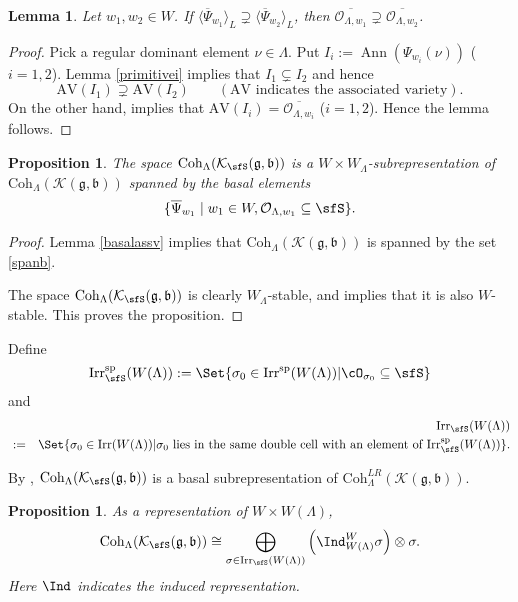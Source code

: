 \documentclass[12pt,a4paper]{amsart}
\newcommand{\AV}{\mathrm{AV}}
\def\subset{\subseteq}
\newcommand{\CK}{{\mathcal {K}}}
\newcommand{\CO}{{\mathcal {O}}}
\DeclareMathOperator{\Ann}{Ann}
\newcommand{\g}{\mathfrak g}
\renewcommand{\b}{\mathfrak b}
\newcommand{\la}{\langle}
\newcommand{\ra}{\rangle}
\newcommand{\be}{\begin {equation}}
\newcommand{\ee}{\end {equation}}
\numberwithin{equation}{section}
\newtheorem{lem}[thm]{Lemma}
\newtheorem{prop}[thm]{Proposition}
\theoremstyle{remark}
\def\Irr{\mathrm{Irr}}
\def\Coh{\mathrm{Coh}}
\begin{document}
\begin{lem}\label{assv33}
Let $w_1, w_2\in W$. If $\la \overline \Psi_{w_1}\ra_L\supsetneq \la \overline \Psi_{w_2}\ra_L$, then $\overline{\CO_{\Lambda, w_1}}\supsetneq \overline{\CO_{\Lambda, w_2}}$.

\end{lem}
\begin{proof}
Pick a  regular dominant element $\nu\in \Lambda$.  Put $I_i:=\Ann(\Psi_{w_i}(\nu))$ ($i=1,2$). Lemma \ref{primitivei} implies that  $I_1\subsetneq I_2$ and hence
\[
  \AV(I_1)\supsetneq \AV(I_2)\qquad (\AV\textrm{ indicates the associated variety}).
\]
On the other hand,  implies that  $\AV(I_i)=\overline{\CO_{\Lambda, w_i}}$ ($i=1,2$). Hence the lemma follows.
\end{proof}



\begin{prop}\label{basals}
The space $\Coh_{\Lambda}(\CK_\sfS(\g,\b))$ is a $W\times W_\Lambda$-subrepresentation of $\Coh_{\Lambda}(\CK(\g,\b))$ spanned by the basal elements
\be\label{spanb}
 \{\overline \Psi_{w_1}\mid w_1\in W,  \CO_{\Lambda, w_1}\subset \sfS\}.
\ee
\end{prop}
\begin{proof}
Lemma \ref{basalassv}  implies that  $\Coh_{\Lambda}(\CK(\g,\b))$ is spanned by  the set \eqref{spanb}.

The space $\Coh_{\Lambda}(\CK_\sfS(\g,\b))$ is  clearly $W_\Lambda$-stable, and  implies that it is also $W$-stable. This proves the proposition.  \end{proof}

Define
\[
  \Irr_\sfS^{\mathrm{sp}}(W(\Lambda)):= \Set{\sigma_0\in \Irr^{\mathrm{sp}}(W(\Lambda))| \cO_{\sigma_0}\subset \sfS}
\]
and
\begin{eqnarray*}%
 && \Irr_\sfS(W(\Lambda))\\
  &:=& \Set{\sigma_0\in \Irr(W(\Lambda))| \sigma_0 \textrm{ lies in the same double cell with an element of } \Irr_\sfS^{\mathrm{sp}}(W(\Lambda))}.
\end{eqnarray*}

By , $\Coh_{\Lambda}(\CK_\sfS(\g,\b))$ is a basal subrepresentation of  $\Coh^{LR}_{\Lambda}(\CK(\g,\b))$.

\begin{prop}\label{cohbbs}
As a representation of $W\times W(\Lambda)$, %
\[
  \Coh_{\Lambda}( \CK_{\sfS}(\g,\b))\cong \bigoplus_{\sigma\in \Irr_\sfS(W(\Lambda))} \left(\Ind_{W(\Lambda)}^W \sigma\right)\otimes \sigma.
\]
Here $\Ind$ indicates the induced representation.
\end{prop}
\end{document}
